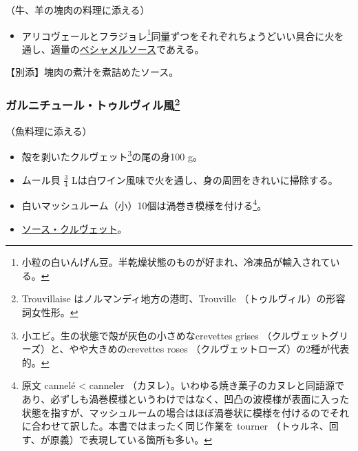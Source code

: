 \begin{recette}


（牛、羊の塊肉の料理に添える）

\begin{itemize}
\tightlist
\item
  アリコヴェールとフラジョレ\footnote{小粒の白いんげん豆。半乾燥状態のものが好まれ、冷凍品が輸入されている。}同量ずつをそれぞれちょうどいい具合に火を通し、適量の\protect\hyperlink{sauce-bechamel}{ベシャメルソース}であえる。
\end{itemize}

【別添】塊肉の煮汁を煮詰めたソース。

\atoaki{}

\hypertarget{garniture-trouveillaise}{%
\subsubsection[ガルニチュール・トゥルヴィル風]{\texorpdfstring{ガルニチュール・トゥルヴィル風\footnote{Trouvillaise
  はノルマンディ地方の港町、Trouville （トゥルヴィル）の形容詞女性形。}}{ガルニチュール・トゥルヴィル風}}\label{garniture-trouveillaise}}



（魚料理に添える）

\begin{itemize}
\item
  殻を剥いたクルヴェット\footnote{小エビ。生の状態で殻が灰色の小さめなcrevettes
    grises （クルヴェットグリーズ）と、やや大きめのcrevettes roses
    （クルヴェットローズ）の2種が代表的。}の尾の身100 g。
\item
  ムール貝 \(\frac{3}{4}\)
  Lは白ワイン風味で火を通し、身の周囲をきれいに掃除する。
\item
  白いマッシュルーム（小）10個は渦巻き模様を付ける\footnote{原文 cannelé
    \textless{} canneler
    （カヌレ）。いわゆる焼き菓子のカヌレと同語源であり、必ずしも渦巻模様というわけではなく、凹凸の波模様が表面に入った状態を指すが、マッシュルームの場合はほぼ渦巻状に模様を付けるのでそれに合わせて訳した。本書ではまったく同じ作業を
    tourner （トゥルネ、回す、が原義）で表現している箇所も多い。}。
\item
  \protect\hyperlink{sauce-aux-crevettes}{ソース・クルヴェット}。
\end{itemize}


\end{recette}
